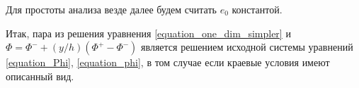 Для простоты анализа везде далее будем считать $e_0$ константой.

Итак, пара из решения уравнения \eqref{equation_one_dim_simpler} и $\Phi = \Phi^- + (y/h)(\Phi^+ - \Phi^-)$ является решением исходной системы уравнений \eqref{equation_Phi}, \eqref{equation_phi}, в том случае если краевые условия имеют описанный вид.